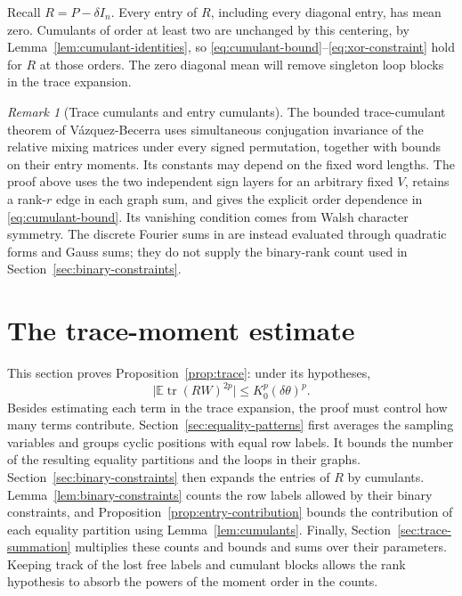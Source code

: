 \documentclass[11pt]{article}
\theoremstyle{definition}
\theoremstyle{remark}
\newtheorem*{remark}{Remark}
\theoremstyle{plain}
\newcommand{\E}{\mathbb E}
\DeclareMathOperator{\tr}{tr}
\begin{document}
Recall \(R=P-\delta I_n\). Every entry of \(R\), including every diagonal
entry, has mean zero. Cumulants of order at least two are unchanged
by this centering, by Lemma~\ref{lem:cumulant-identities}, so
\eqref{eq:cumulant-bound}--\eqref{eq:xor-constraint} hold for \(R\) at those orders.
The zero diagonal mean will remove singleton loop blocks in
the trace expansion.

\begin{remark}[Trace cumulants and entry cumulants]
The bounded trace-cumulant theorem of V\'azquez-Becerra
\cite[Lemma~6 and Theorem~7]{vazquez_becerra} uses simultaneous
conjugation invariance of the relative mixing matrices under every
signed permutation, together with bounds on their entry moments.
Its constants may depend on the fixed word lengths. The proof above
uses the two independent sign layers for an arbitrary fixed $V$,
retains a rank-$r$ edge in each graph sum, and gives the explicit
order dependence in \eqref{eq:cumulant-bound}. Its vanishing condition
comes from Walsh character symmetry. The discrete Fourier sums in
\cite[Section~3.2]{vazquez_becerra} are instead evaluated through
quadratic forms and Gauss sums; they do not supply the binary-rank
count used in Section~\ref{sec:binary-constraints}.
\end{remark}


\section{The trace-moment estimate}\label{sec:trace-proof}

This section proves Proposition~\ref{prop:trace}: under its hypotheses,
\[
 \bigl|\E\tr(RW)^{2p}\bigr|\le K_0^p(\delta\theta)^p.
\]
Besides estimating each term in the trace expansion, the proof must control
how many terms contribute. Section~\ref{sec:equality-patterns} first
averages the sampling variables and groups cyclic positions with equal
row labels. It bounds the number of the resulting equality partitions
and the loops in their graphs. Section~\ref{sec:binary-constraints}
then expands the entries of $R$ by cumulants. Lemma~\ref{lem:binary-constraints}
counts the row labels allowed by their binary constraints, and
Proposition~\ref{prop:entry-contribution} bounds the contribution of
each equality partition using Lemma~\ref{lem:cumulants}.
Finally, Section~\ref{sec:trace-summation} multiplies these
counts and bounds and sums over their parameters. Keeping track of
the lost free labels and cumulant blocks allows the rank hypothesis
to absorb the powers of the moment order in the counts.
\end{document}
